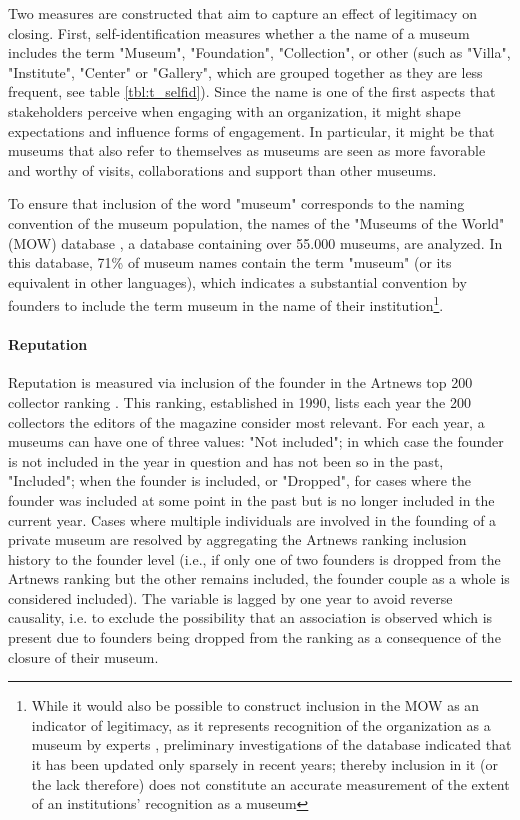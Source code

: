 \documentclass[12pt]{article}
\begin{document}
Two measures are constructed that aim to capture an effect of legitimacy on closing.
First, self-identification measures whether a the name of a museum includes the term "Museum", "Foundation", "Collection", or other (such as "Villa", "Institute", "Center" or "Gallery", which are grouped together as they are less frequent, see table \ref{tbl:t_selfid}).
Since the name is one of the first aspects that stakeholders perceive when engaging with an organization, it might shape expectations and influence forms of engagement.
In particular, it might be that museums that also refer to themselves as museums are seen as more favorable and worthy of visits, collaborations and support than other museums.


To ensure that inclusion of the word "museum" corresponds to the naming convention of the museum population, the names of the "Museums of the World" (MOW) database \parencite{deGruyter_2021_MOW}, a database containing over 55.000 museums, are analyzed.
In this database, 71\% of museum names contain the term "museum" (or its equivalent in other languages), which indicates a substantial convention by founders to include the term museum in the name of their institution\footnote{While it would also be possible to construct inclusion in the MOW as an indicator of legitimacy, as it represents recognition of the organization as a museum by experts \parencite{Zuckerman_1999_illegitimacy}, preliminary investigations of the database indicated that it has been  updated only sparsely in recent years; thereby inclusion in it (or the lack therefore) does not constitute an accurate measurement of the extent of an institutions' recognition as a museum}.
\paragraph*{Reputation}


Reputation is measured via inclusion of the founder in the Artnews top 200 collector ranking \parencite{Artnews_ranking}.
This ranking, established in 1990, lists each year the 200 collectors the editors of the magazine consider most relevant.
For each year, a museums can have one of three values: "Not included"; in which case the founder is not included in the year in question and has not been so in the past, "Included"; when the founder is included, or "Dropped", for cases where the founder was included at some point in the past but is no longer included in the current year.
Cases where multiple individuals are involved in the founding of a private museum are resolved by aggregating the Artnews ranking inclusion history to the founder level (i.e., if only one of two founders is dropped from the Artnews ranking but the other remains included, the founder couple as a whole is considered included).
The variable is lagged by one year to avoid reverse causality, i.e. to exclude the possibility that an association is observed which is present due to founders being dropped from the ranking as a consequence of the closure of their museum.
\end{document}
